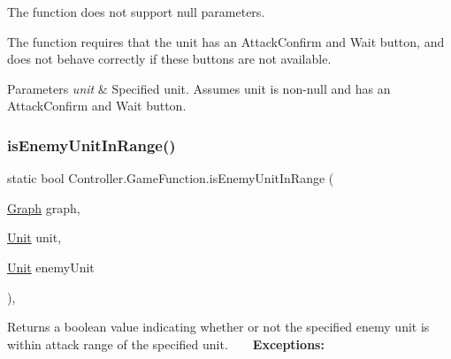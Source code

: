 \begin{DoxyItemize}
\item The function does not support null parameters.
\item The function requires that the unit has an Attack\+Confirm and Wait button, and does not behave correctly if these buttons are not available. 
\begin{DoxyParams}{Parameters}
{\em unit} & Specified unit. Assumes unit is non-\/null and has an Attack\+Confirm and Wait button. \\
\hline
\end{DoxyParams}

\end{DoxyItemize}\hypertarget{class_controller_1_1_game_function_a0e573edb9537563b1ef6a854739c5517}{}\label{class_controller_1_1_game_function_a0e573edb9537563b1ef6a854739c5517} 
\subsubsection{\texorpdfstring{is\+Enemy\+Unit\+In\+Range()}{isEnemyUnitInRange()}}
{\footnotesize\ttfamily static bool Controller.\+Game\+Function.\+is\+Enemy\+Unit\+In\+Range (\begin{DoxyParamCaption}\item[{\hyperlink{class_model_1_1_map_module_1_1_graph}{Graph}}]{graph,  }\item[{\hyperlink{interface_model_1_1_unit_module_1_1_unit}{Unit}}]{unit,  }\item[{\hyperlink{interface_model_1_1_unit_module_1_1_unit}{Unit}}]{enemy\+Unit }\end{DoxyParamCaption})\hspace{0.3cm}{\ttfamily [inline]}, {\ttfamily [static]}}

Returns a boolean value indicating whether or not the specified enemy unit is within attack range of the specified unit. ~\newline
~\newline
 {\bfseries Exceptions\+:} ~\newline

